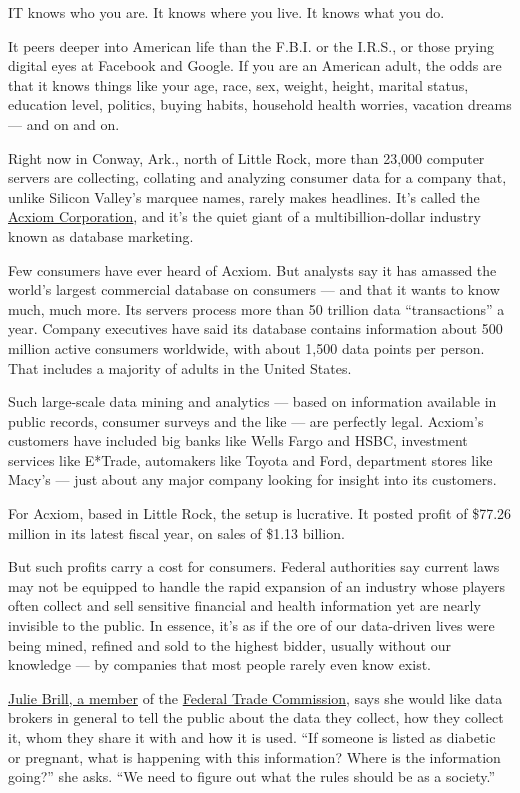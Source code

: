 IT knows who you are. It knows where you live. It knows what you do.

It peers deeper into American life than the F.B.I. or the I.R.S., or
those prying digital eyes at Facebook and Google. If you are an American
adult, the odds are that it knows things like your age, race, sex,
weight, height, marital status, education level, politics, buying
habits, household health worries, vacation dreams --- and on and on.

Right now in Conway, Ark., north of Little Rock, more than 23,000
computer servers are collecting, collating and analyzing consumer data
for a company that, unlike Silicon Valley's marquee names, rarely makes
headlines. It's called the
\href{http://www.acxiom.com/about-acxiom/}{Acxiom Corporation}, and it's
the quiet giant of a multibillion-dollar industry known as database
marketing.

Few consumers have ever heard of Acxiom. But analysts say it has amassed
the world's largest commercial database on consumers --- and that it
wants to know much, much more. Its servers process more than 50 trillion
data ``transactions'' a year. Company executives have said its database
contains information about 500 million active consumers worldwide, with
about 1,500 data points per person. That includes a majority of adults
in the United States.

Such large-scale data mining and analytics --- based on information
available in public records, consumer surveys and the like --- are
perfectly legal. Acxiom's customers have included big banks like Wells
Fargo and HSBC, investment services like E*Trade, automakers like Toyota
and Ford, department stores like Macy's --- just about any major company
looking for insight into its customers.

For Acxiom, based in Little Rock, the setup is lucrative. It posted
profit of \$77.26 million in its latest fiscal year, on sales of \$1.13
billion.

But such profits carry a cost for consumers. Federal authorities say
current laws may not be equipped to handle the rapid expansion of an
industry whose players often collect and sell sensitive financial and
health information yet are nearly invisible to the public. In essence,
it's as if the ore of our data-driven lives were being mined, refined
and sold to the highest bidder, usually without our knowledge --- by
companies that most people rarely even know exist.

\href{http://www.ftc.gov/commissioners/brill/index.shtml}{Julie Brill, a
member} of the \href{http://www.ftc.gov/}{Federal Trade Commission},
says she would like data brokers in general to tell the public about the
data they collect, how they collect it, whom they share it with and how
it is used. ``If someone is listed as diabetic or pregnant, what is
happening with this information? Where is the information going?'' she
asks. ``We need to figure out what the rules should be as a society.''

